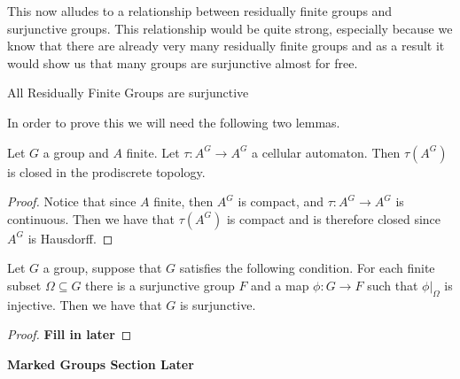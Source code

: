 This now alludes to a relationship between residually finite groups and 
surjunctive groups. This relationship would be quite strong, especially because 
we know that there are already very many residually finite groups and as a result 
it would show us that many groups are surjunctive almost for free.

\begin{thm}
  All Residually Finite Groups are surjunctive
\end{thm}

In order to prove this we will need the following two lemmas.

\begin{lemma}
  Let $G$ a group and $A$ finite. Let $\tau: A^{G} \to A^{G}$ a cellular
  automaton. Then $\tau(A^{G})$ is closed in the prodiscrete topology.
\end{lemma}
\begin{proof}
  Notice that since $A$ finite, then $A^{G}$ is compact, and $\tau: A^{G} \to
  A^{G}$ is continuous. Then we have that $\tau(A^{G})$ is compact and is
  therefore closed since $A^{G}$ is Hausdorff.
\end{proof}

\begin{lemma}
  Let $G$ a group, suppose that $G$ satisfies the following condition. For each
  finite subset $\Omega \subseteq G$ there is a surjunctive group $F$ and a map
  $\phi: G \to F$ such that $\phi|_{\Omega}$ is injective. Then we have that
  $G$ is surjunctive.
\end{lemma}
\begin{proof}
  \textbf{Fill in later}
\end{proof}

\textbf{Marked Groups Section Later}
